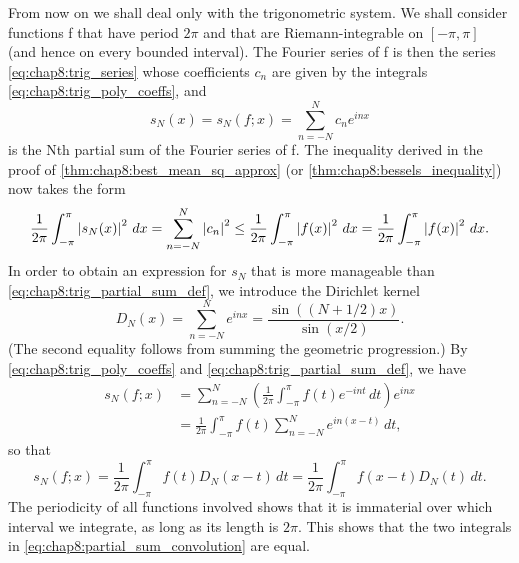 \begin{remark} %
  \label{rem:chap8:trig_series_focus}
  From now on we shall deal only with the trigonometric system. We
  shall consider functions f that have period $2\pi$ and that are
  Riemann-integrable on $[-\pi, \pi]$ (and hence on every bounded
  interval). The Fourier series of f is then the series
  \eqref{eq:chap8:trig_series} whose coefficients $c_n$ are given by
  the integrals \eqref{eq:chap8:trig_poly_coeffs}, and
  \begin{equation} \label{eq:chap8:trig_partial_sum_def}
    s_N(x) = s_N(f; x) = \sum_{n=-N}^N c_n e^{inx}
  \end{equation}
  is the Nth partial sum of the Fourier series of f. The inequality
  derived in the proof of \autoref{thm:chap8:best_mean_sq_approx} (or
  \autoref{thm:chap8:bessels_inequality}) now takes the form
  \begin{equation} \label{eq:chap8:trig_partial_sum_norm}
    \frac{1}{2\pi} \int_{-\pi}^{\pi} \left\lvert s_N(x) \right\rvert^2 \, dx =
    \sum_{n=-N}^N \left\lvert c_n \right\rvert^2 \le \frac{1}{2\pi} \int_{-\pi}^{\pi}
    \left\lvert f(x) \right\rvert^2 \, dx = \frac{1}{2\pi} \int_{-\pi}^{\pi} \left\lvert f(x) \right\rvert^2 \, dx.
  \end{equation}
  In order to obtain an expression for $s_N$ that is more manageable
  than \eqref{eq:chap8:trig_partial_sum_def}, we introduce the Dirichlet kernel
  \begin{equation} \label{eq:chap8:dirichlet_kernel}
    D_N(x) = \sum_{n=-N}^N e^{inx} = \frac{\sin((N + 1/2)x)}{\sin(x/2)}.
  \end{equation}
  (The second equality follows from summing the geometric progression.)
  By \eqref{eq:chap8:trig_poly_coeffs} and
  \eqref{eq:chap8:trig_partial_sum_def}, we have
  \begin{align*}
    s_N(f; x) &= \sum_{n=-N}^N \left( \frac{1}{2\pi}
    \int_{-\pi}^{\pi} f(t) e^{-int} \, dt \right) e^{inx} \\
    &= \frac{1}{2\pi} \int_{-\pi}^{\pi} f(t) \sum_{n=-N}^N e^{in(x-t)} \, dt,
  \end{align*}
  so that
  \begin{equation} \label{eq:chap8:partial_sum_convolution}
    s_N(f; x) = \frac{1}{2\pi} \int_{-\pi}^{\pi} f(t) D_N(x-t) \, dt
    = \frac{1}{2\pi} \int_{-\pi}^{\pi} f(x-t) D_N(t) \, dt.
  \end{equation}
  The periodicity of all functions involved shows that it is
  immaterial over which interval we integrate, as long as its length
  is $2\pi$. This shows that the two integrals in
  \eqref{eq:chap8:partial_sum_convolution} are equal.
\end{remark}


